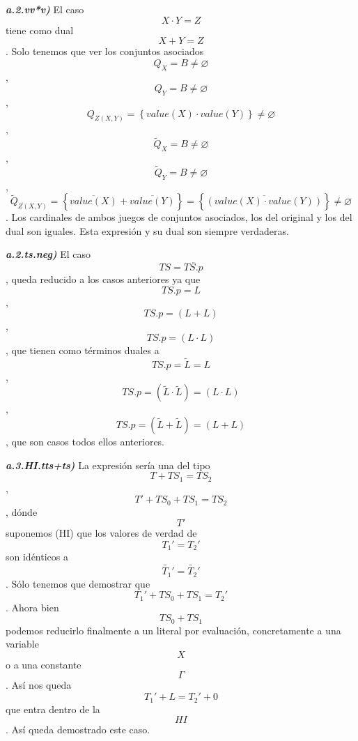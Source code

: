 \begin{enumerate}
\begin{enumerate}
\begin{enumerate}
\begin{enumerate}
\begin{enumerate}
          \emph{\textbf{a.2.vv*v)}} El caso \[{X \cdot Y} = Z\] tiene
          como dual \[{X + Y} = Z\]. Solo tenemos que ver los conjuntos
          asociados \[{Q_{X} = B} \neq \varnothing\] ,
          \[{Q_{Y} = B} \neq \varnothing\] ,
          \[{Q_{Z{({X,Y})}} = \left\{ {{\mathit{value}{(X)}} \cdot {\mathit{value}{(Y)}}} \right\}} \neq \varnothing\]
          , \[{{\widetilde{Q}}_{X} = B} \neq \varnothing\] ,
          \[{{\widetilde{Q}}_{Y} = B} \neq \varnothing\] ,
          \[{{{\widetilde{Q}}_{Z{({X,Y})}} = \left\{ {\overline{\mathit{value}{(X)}} + \overline{\mathit{value}{(Y)}}} \right\}} = \left\{ \overline{\left( {{\mathit{value}{(X)}}\cdot{\mathit{value}{(Y)}}} \right)} \right\}} \neq \varnothing\]
          . Los cardi\-nales de ambos juegos de conjuntos asociados, los
          del original y los del dual son iguales. Esta expresión y su
          dual son siempre verdaderas.

          \emph{\textbf{a.2.ts.neg)}} El caso
          \[\mathit{TS} = \overline{\mathit{TS.p}}\], queda reducido a
          los casos anteriores ya que \[\mathit{TS.p} = L\] ,
          \[\mathit{TS.p} = \left( {L + L} \right)\] ,
          \[\mathit{TS.p} = \left( {L \cdot L} \right)\], que tienen
          como térmi\-nos duales a
          \[{\mathit{TS.p} = \widetilde{L}} = L\] ,
          \[{\mathit{TS.p} = \left( {\widetilde{L} \cdot \widetilde{L}} \right)} = \left( {L \cdot L} \right)\]
          ,
          \[{\mathit{TS.p} = \left( {\widetilde{L} + \widetilde{L}} \right)} = \left( {L + L} \right)\]
          , que son casos todos ellos anteriores.

          \emph{\textbf{a.3.HI.tts+ts)}} La expresión sería una del tipo
          \[{T + \mathit{TS}_{1}} = \mathit{TS}_{2}\] ,
          \[T{{{' + \mathit{TS}_{0}} + \mathit{TS}_{1}} = \mathit{TS}_{2}}\],
          dónde \[T'\]suponemos (HI) que los valores de ver\-dad de
          \[T_{1}{' = T_{2}}'\] son idénticos a
          \[\widetilde{T_{1}}{' = \widetilde{T_{2}}}'\]. Sólo tenemos
          que de\-mostrar que
          \[T_{1}{{{' + \mathit{TS}_{0}} + \mathit{TS}_{1}} = T_{2}}'\].
          Ahora bien \[\mathit{TS}_{0} + \mathit{TS}_{1}\] podemos
          re\-ducirlo finalmente a un literal por evaluación,
          concretamente a una variable \[X\] o a una constante
          \[\Gamma\]. Así nos queda \[T_{1}{{' + L} = T_{2}}{' + 0}\]que
          entra dentro de la \[\mathit{HI}\]. Así queda demostrado este
          caso.


\end{enumerate}
\end{enumerate}
\end{enumerate}
\end{enumerate}
\end{enumerate}
